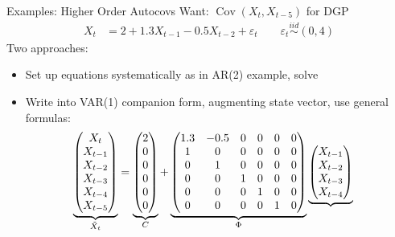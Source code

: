 \documentclass[aspectratio=169, handout]{beamer}
\newcommand{\iid}{\overset{iid}{\sim}}
\newcommand{\Cov}{\operatorname{Cov}}
\begin{document}
{\scriptsize
\begin{frame}{Examples: Higher Order Autocovs}
\alert{Want}:
$\Cov(X_t,X_{t-5})$
for DGP
\begin{align*}
  X_t
  &=
  2 + 1.3 X_{t-1} - 0.5 X_{t-2} + \varepsilon_t
  \qquad
  \varepsilon_t \iid (0,4)
\end{align*}
Two approaches:
\begin{itemize}
  \item Set up equations systematically as in AR(2) example, solve
  \item Write into VAR(1) companion form, augmenting state vector, use
    general formulas:
    \begin{align*}
      \underbrace{%
        \begin{pmatrix}
          X_t \\
          X_{t-1} \\
          X_{t-2} \\
          X_{t-3} \\
          X_{t-4} \\
          X_{t-5}
        \end{pmatrix}
      }_{\tilde{X}_{t}}
      &=
      \underbrace{%
        \begin{pmatrix}
          2 \\
          0 \\
          0 \\
          0 \\
          0 \\
          0 \\
        \end{pmatrix}
      }_{C}
      +
      \underbrace{%
        \begin{pmatrix}
          1.3 & -0.5 & 0 & 0 & 0 & 0 \\
          1 & 0 & 0 & 0 & 0 & 0 \\
          0 & 1 & 0 & 0 & 0 & 0 \\
          0 & 0 & 1 & 0 & 0 & 0 \\
          0 & 0 & 0 & 1 & 0 & 0 \\
          0 & 0 & 0 & 0 & 1 & 0 \\
        \end{pmatrix}
      }_{\Phi}
      \underbrace{%
        \begin{pmatrix}
          X_{t-1} \\
          X_{t-2} \\
          X_{t-3} \\
          X_{t-4} \\

\end{pmatrix}}
\end{align*}
\end{itemize}
\end{frame}}
\end{document}
